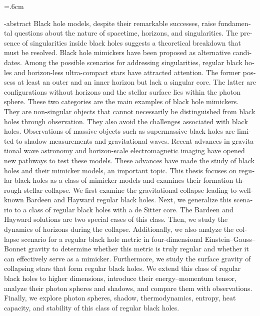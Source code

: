
\baselineskip=.6cm
\begin{latin}
\en-abstract{
Black hole models, despite their remarkable successes, raise fundamental questions about the nature of spacetime, horizons, and singularities. The presence of singularities inside black holes suggests a theoretical breakdown that must be resolved. Black hole mimickers have been proposed as alternative candidates. Among the possible scenarios for addressing singularities, regular black holes and horizon-less ultra-compact stars have attracted attention. The former possess at least an outer and an inner horizon but lack a singular core. The latter are configurations without horizons and the stellar surface lies within the photon sphere. 
These two categories are the main examples of black hole mimickers. They are non-singular objects that cannot necessarily be distinguished from black holes through observation. They also avoid the challenges associated with black holes. 
Observations of massive objects such as supermassive black holes are limited to shadow measurements and gravitational waves. Recent advances in gravitational wave astronomy and horizon-scale electromagnetic imaging have opened new pathways to test these models. These advances have made the study of black holes and their mimicker models, an important topic. 
This thesis focuses on regular black holes  as a class of mimicker models and examines their formation through stellar collapse.
 We first examine the gravitational collapse leading to well-known  Bardeen and Hayward regular black holes.  Next, we generalize this scenario to a class of regular black holes with a de Sitter core. The Bardeen and Hayward solutions are two special cases of this class. Then, we study the dynamics of horizons during the collapse.
Additionally, we also analyze the collapse scenario for a regular black hole metric in four-dimensional Einstein–Gauss–Bonnet gravity to determine  whether this metric is truly regular and whether it can effectively serve as a mimicker. Furthermore, we study the surface gravity of collapsing stars that form regular black holes. We  extend this class of regular black holes to higher dimensions, introduce their energy–momentum tensor, analyze their photon spheres and shadows, and compare them with observations. Finally, we explore photon spheres, shadow, thermodynamics, entropy, heat capacity, and stability of this class of regular black holes.
}
\latinfirstPage
\end{latin}
